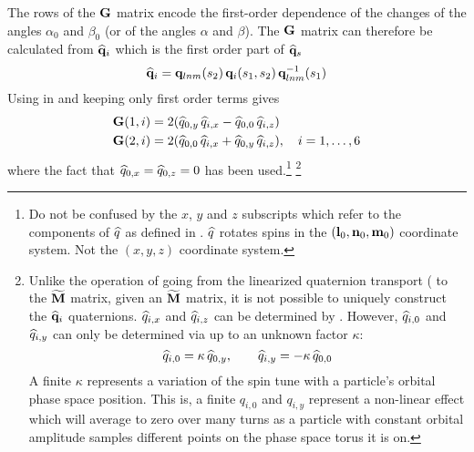 The rows of the ${\bf G}$ matrix encode the first-order dependence of the changes of the angles
$\alpha_0$ and $\beta_0$ (or of the angles $\alpha$ and $\beta$).  The ${\bf G}$ matrix can therefore
be calculated from $\widehat{{\bf q}}_i$ which is the first order part of $\widehat{{\bf q}}_s$
\begin{equation}
  \widehat{{\bf q}}_i = {\bf q}_{lnm}(s_2) \, {\bf q}_i(s_1, s_2) \, {\bf q}_{lnm}^{-1}(s_1)
\end{equation}
Using  in  and keeping only first order terms gives
\begin{align}
  {\bf G}(1,i) &= 2 (\widehat q_{0,y} \, \widehat q_{i,x} - \widehat q_{0,0} \, \widehat q_{i,z}) 
  \label{g2qqqq} \\
  {\bf G}(2,i) &= 2 (\widehat q_{0,0} \, \widehat q_{i,x} + \widehat q_{0,y} \, \widehat q_{i,z}),
  \quad i = 1, \ldots, 6
  \nonumber
\end{align}
where the fact that $\widehat q_{0,x} = \widehat q_{0,z} = 0$ has been used.\footnote
  {
Do not be confused by the $x$, $y$ and $z$ subscripts which refer to the components of $\widehat q$
as defined in . $\widehat q$ rotates spins in the $({\bf l}_0, {\bf n}_0, {\bf m}_0)$ coordinate system.
Not the $(x, y, z)$ coordinate system.
  }
\footnote
  {
Unlike the operation of going from the linearized quaternion transport ( to the
$\widetilde{{\bf M}}$ matrix, given an $\widetilde{{\bf M}}$ matrix, it is not possible to uniquely construct
the $\widehat{{\bf q}}_i$ quaternions. $\widehat q_{i,x}$ and $\widehat q_{i,z}$ can be determined by
. However, $\widehat q_{i,0}$ and $\widehat q_{i,y}$ can only be determined via  up
to an unknown factor $\kappa$:
\begin{equation}
  \widehat q_{i,0} = \kappa \, \widehat q_{0,y}, \qquad \widehat q_{i,y} = -\kappa \, \widehat q_{0,0}
\end{equation}
A finite $\kappa$ represents a variation of the spin tune with a particle's orbital phase space
position. This is, a finite $q_{i,0}$ and $q_{i,y}$ represent a non-linear effect which will average
to zero over many turns as a particle with constant orbital amplitude samples different points on
the phase space torus it is on.
  }

